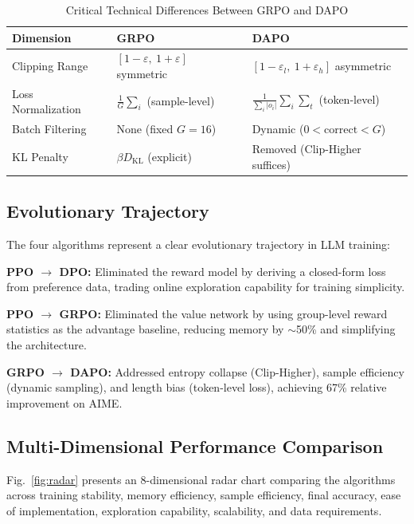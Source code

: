 \begin{table}[ht]
\centering
\caption{Critical Technical Differences Between GRPO and DAPO}
\label{tab:tech}
\begin{tabular}{p{2cm}p{2.5cm}p{2.5cm}}
\toprule
\textbf{Dimension} & \textbf{GRPO} & \textbf{DAPO} \\
\midrule
Clipping Range & $[1{-}\varepsilon,\ 1{+}\varepsilon]$ symmetric & $[1{-}\varepsilon_l,\ 1{+}\varepsilon_h]$ asymmetric \\
Loss Normalization & $\frac{1}{G}\sum_i$ (sample-level) & $\frac{1}{\sum_i |o_i|}\sum_i\sum_t$ (token-level) \\
Batch Filtering & None (fixed $G{=}16$) & Dynamic ($0 < \text{correct} < G$) \\
KL Penalty & $\beta D_{\text{KL}}$ (explicit) & Removed (Clip-Higher suffices) \\
\bottomrule
\end{tabular}
\end{table}

\subsection{Evolutionary Trajectory}

The four algorithms represent a clear evolutionary trajectory in LLM training:

\textbf{PPO $\to$ DPO:} Eliminated the reward model by deriving a closed-form loss from preference data, trading online exploration capability for training simplicity.

\textbf{PPO $\to$ GRPO:} Eliminated the value network by using group-level reward statistics as the advantage baseline, reducing memory by $\sim$50\% and simplifying the architecture.

\textbf{GRPO $\to$ DAPO:} Addressed entropy collapse (Clip-Higher), sample efficiency (dynamic sampling), and length bias (token-level loss), achieving 67\% relative improvement on AIME.

\subsection{Multi-Dimensional Performance Comparison}

Fig.~\ref{fig:radar} presents an 8-dimensional radar chart comparing the algorithms across training stability, memory efficiency, sample efficiency, final accuracy, ease of implementation, exploration capability, scalability, and data requirements.

